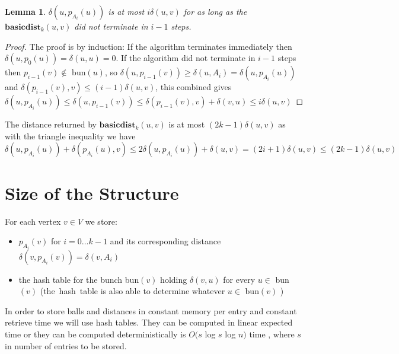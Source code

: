 \documentclass[shortabstract, lic, english]{iithesis}
\theoremstyle{definition} \newtheorem{definition}{Definition}[chapter]
\theoremstyle{plain} \newtheorem{remark}[definition]{Observation}
\theoremstyle{plain} \newtheorem{theorem}[definition]{Theorem}
\theoremstyle{plain} \newtheorem{lemma}[definition]{Lemma}
\theoremstyle{plain} \newtheorem{conjecture}[definition]{Conjecture}
\begin{document}
\begin{lemma}
$\delta(u, p_{A_i}(u))$ is at most $i\delta(u,v)$
for as long as the $\mathbf{basicdist}_k(u, v)$ did not terminate in $i-1$ steps.
\end{lemma}
\begin{proof} 
The proof is by induction:
\newline
If the algorithm terminates immediately then $\delta(u, p_0(u)) = \delta(u, u) = 0$.
\newline
If the algorithm did not terminate in $i-1$ steps then 
\newline
$p_{i-1}(v) \notin $ bun$(u)$, so
$\delta(u, p_{i-1}(v)) \geq \delta(u, A_{i}) = \delta(u, p_{A_i}(u))$ and
\newline
$\delta(p_{i-1}(v), v) \leq (i-1)\delta(u, v)$, this combined gives
\newline
$\delta(u, p_{A_i}(u)) \leq \delta(u, p_{i-1}(v)) \leq \delta(p_{i-1}(v), v) + \delta(v, u) \leq i\delta(u, v)$
\end{proof}

The distance returned by $\mathbf{basicdist}_k(u, v)$ is at most $(2k - 1)\delta(u,v)$ as
with the triangle inequality we have \newline
$\delta(u,p_{A_i}(u)) + \delta( p_{A_i}(u), v) \leq 2\delta(u,  p_{A_i}(u)) + \delta(u,v) = (2i + 1)\delta(u,v) \leq (2k - 1)\delta(u,v)$


\section{Size of the Structure}

For each vertex $v \in V$ we store:
\begin{itemize}
    \item $p_{A_i}(v)$ for $i=0 \ldots k-1$ and its corresponding distance 
    $\delta(v, p_{A_i}(v)) = \delta(v, A_i)$
    \item the hash table for the bunch bun$(v)$ holding $\delta(v, u)$ for every $u \in $ bun$(v)$
    (the~hash~table is also able to determine whatever $u \in $ bun$(v)$ )
\end{itemize}

In order to store balls and distances in constant memory per entry and constant retrieve time we will use hash tables.
They can be computed in linear expected time \cite{2LevelHashTable} or
they can be computed deterministically is $O(s $ log $ s $ log $ n)$ time \cite{hashTableDerandomization}, where $s$ in number of entries to be stored.
\end{document}
